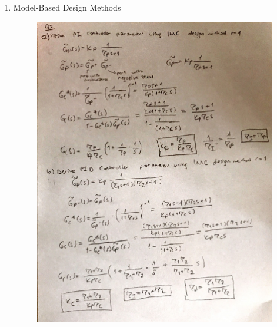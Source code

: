 \documentclass[a4paper,12pt]{article}
\begin{document}
\begin{enumerate}
\begin{enumerate}
				
		
			\end{enumerate}
			
			\item  Model-Based Design Methods

	
				\begin{figure}[H]
					\center
					\setlength{\unitlength}{\textwidth} 
					\includegraphics[width=1.0\unitlength]{images/2ab}
				\end{figure}
				\begin{figure}[H]
					\center
					\setlength{\unitlength}{\textwidth} 

\end{figure}
\end{enumerate}
\end{document}
